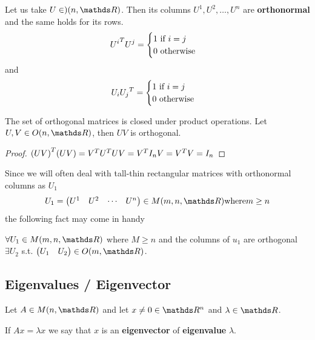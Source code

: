 \documentclass[ComputationalMathematics.tex]{subfiles}
\begin{document}
\begin{proposition}
  Let us take $U \in )(n, \R)$.
  Then its columns $U^1, U^2, \ldots, U^n$ are \textbf{orthonormal} and the same holds for its rows.
  \[
  {U^i}^{T} U^j = \begin{cases}
    1 \text{ if } i=j\\
    0 \text{ otherwise}
  \end{cases}
  \]
  and
  \[
    U_i {U_j}^{T} = \begin{cases}
    1 \text{ if } i=j\\
    0 \text{ otherwise}
  \end{cases}
  \]
\end{proposition}

\begin{proposition}
  The set of orthogonal matrices is closed under product operations.
  Let $U, V \in O(n, \R)$, then $U V$ is orthogonal.
\end{proposition}

\begin{proof}
  ${(UV)}^{T} (UV) = {V}^{T} {U}^{T} U V = {V}^{T} I_n V = {V}^{T} V = I_n$
\end{proof}

Since we will often deal with tall-thin rectangular matrices with
orthonormal columns as $U_1$
  \[
    U_1 = \begin{pmatrix} U^1 & U^2 & \cdots & U^n\end{pmatrix} \in M(m, n, \R) \text{where} m \geq n
  \]
the following fact may come in handy

\begin{proposition}
  $\forall U_1 \in M(m, n, \R)$ where $M \ge n$ and the columns of $u_1$ are orthogonal $\exists U_2$ s.t. $\begin{pmatrix} U_1 & U_2 \end{pmatrix} \in O(m, \R)$.
\end{proposition}

\subsection{Eigenvalues / Eigenvector}

\begin{definition}
  Let $A \in M(n, \R)$ and let $x \neq 0 \in \R^n$ and $\lambda \in \R$.

  If $Ax = \lambda x$ we say that $x$ is an \textbf{eigenvector} of \textbf{eigenvalue} $\lambda$.
\end{definition}
\end{document}
